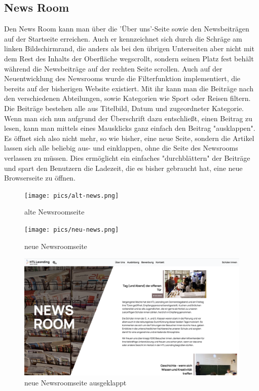 \subsection{News Room}

Den News Room kann man über die 'Über uns'-Seite sowie den Newsbeiträgen auf der Startseite erreichen. Auch er kennzeichnet sich durch 
die Schräge am linken Bildschirmrand, die anders als bei den übrigen Unterseiten aber nicht mit dem Rest des Inhalts der Oberfläche wegscrollt,
sondern seinen Platz fest behält während die Newsbeiträge auf der rechten Seite scrollen.
Auch auf der Neuentwicklung des Newsrooms wurde die Filterfunktion implementiert, die bereits auf der bisherigen Website existiert.
Mit ihr kann man die Beiträge nach den verschiedenen Abteilungen, sowie Kategorien wie Sport oder Reisen filtern. Die Beiträge bestehen alle aus Titelbild,
Datum und zugeordneter Kategorie. Wenn man sich nun aufgrund der Überschrift dazu entschließt, einen Beitrag zu lesen, kann man mittels eines Mausklicks
ganz einfach den Beitrag "ausklappen". Es öffnet sich also nicht mehr, so wie bisher, eine neue Seite, sondern die Artikel lassen sich alle beliebig aus- und einklappen,
ohne die Seite des Newsrooms verlassen zu müssen. Dies ermöglicht ein einfaches "durchblättern" der Beiträge und spart den Benutzern die Ladezeit, 
die es bisher gebraucht hat, eine neue Browserseite zu öffnen.

\begin{figure}
   \begin{minipage}[b]{.4\linewidth} 
      \texttt{[image: pics/alt-news.png]}
      \caption{alte Newsroomseite}
      \label{fig:impl:alt:start}
   \end{minipage}
   \hspace{.05\linewidth}
   \begin{minipage}[b]{.4\linewidth}
      \texttt{[image: pics/neu-news.png]}
      \caption{neue Newsroomseite}
      \label{fig:impl:neu:start}
   \end{minipage}
   \hspace{.05\linewidth}
   \begin{minipage}[b]{.4\linewidth}
      \includegraphics[width=\linewidth]{pics/neu-newsausgeklappt.png}
      \caption{neue Newsroomseite ausgeklappt}
      \label{fig:impl:neu:start}
   \end{minipage}
\end{figure}

